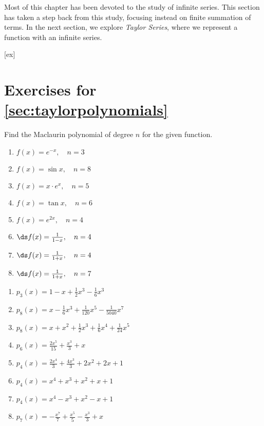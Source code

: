 Most of this chapter has been devoted to the study of infinite series. This section has taken a step back from this study, focusing instead on finite summation of terms. In the next section, we explore {\textit{Taylor Series}}, where we represent a function with an infinite series.

[ex]
\section*{Exercises for \ref{sec:taylorpolynomials}}

\begin{enumialphparenastyle}

\begin{ex}
Find the Maclaurin polynomial of degree $n$ for the given function.
\begin{enumerate}
\item {$f(x) = e^{-x}, \quad n=3$
}
\item {$f(x) = \sin x, \quad n=8$
}
\item {$f(x) = x\cdot e^x, \quad n=5$
}
\item {$f(x) = \tan x, \quad n=6$
}
\item {$f(x) = e^{2x}, \quad n=4$
}
\item {$\ds f(x) = \frac1{1-x}, \quad n=4$
}
\item {$\ds f(x) = \frac1{1+x}, \quad n=4$
}
\item {$\ds f(x) = \frac1{1+x}, \quad n=7$
}
\end{enumerate}

\begin{sol}
\begin{enumerate}
\item 
{$p_3(x) = 1-x+\frac12x^3-\frac16x^3$
}
\item 
{$p_8(x) = x-\frac16x^3+\frac1{120}x^5-\frac1{5040}x^7$
}
\item 
{$p_8(x) = x+x^2+\frac12x^3+\frac16x^4+\frac1{24}x^5$
}
\item 
{$p_6(x) = \frac{2 x^5}{15}+\frac{x^3}{3}+x$
}
\item 
{$p_4(x) = \frac{2 x^4}{3}+\frac{4 x^3}{3}+2 x^2+2 x+1$
}
\item 
{$p_4(x) = x^4+x^3+x^2+x+1$
}
\item 
{$p_4(x) = x^4-x^3+x^2-x+1$
}
\item 
{$p_7(x) = -\frac{x^7}{7}+\frac{x^5}{5}-\frac{x^3}{3}+x$
}
\end{enumerate}
\end{sol}


\end{ex}
\end{enumialphparenastyle}
